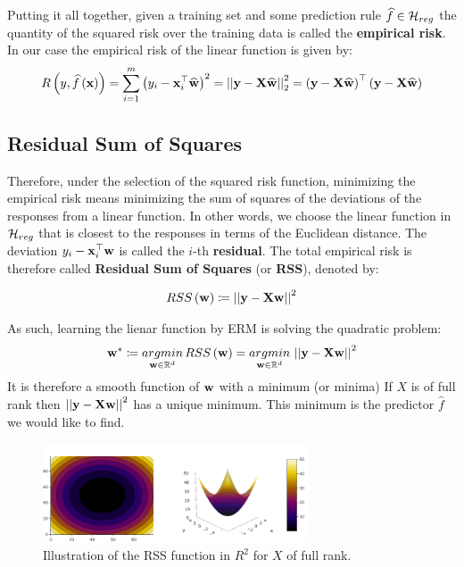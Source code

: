 Putting it all together, given a training set \trainset and some prediction rule $\widehat{f}\in\mathcal{H}_{reg}$ the quantity of the squared risk over the training data is called the \textbf{empirical risk}. In our case the empirical risk of the linear function is given by: $$ R\left(y,\widehat{f}\left(\mathbf{x}\right)\right)=\sum^m_{i=1}\left(y_i-\mathbf{x}_i^\top\widehat{\mathbf{w}}\right)^2 = \left|\left| \mathbf{y}-\mathbf{X}\widehat{\mathbf{w}}\right|\right|^2_2=\left(\mathbf{y}-\mathbf{X}\widehat{\mathbf{w}}\right)^\top \left(\mathbf{y}-\mathbf{X}\widehat{\mathbf{w}}\right)$$

\subsection{Residual Sum of Squares}\label{rss}
Therefore, under the selection of the squared risk function, minimizing the empirical risk means minimizing the sum of squares of the deviations of the responses from a linear function. In other words, we choose the linear function in $\mathcal{H}_{reg}$ that is closest to the responses in terms of the Euclidean distance. The deviation $y_i-\mathbf{x}_i^\top\mathbf{w}$ is called the $i$-th \textbf{residual}. The total empirical risk is therefore called \textbf{Residual Sum of Squares} (or \textbf{RSS}), denoted by:

\begin{align}
RSS\left(\mathbf{w}\right) \coloneqq \left|\left| \mathbf{y}-\mathbf{X}\mathbf{w}\right|\right|^2
\label{eqn:rss}
\end{align}

As such, learning the lienar function by ERM is solving the quadratic problem:
\begin{align}
\mathbf{w}^*\coloneqq\underset{\mathbf{w}\in\mathbb{R}^d}{argmin}\,RSS\left(\mathbf{w}\right)=\underset{\mathbf{w}\in\mathbb{R}^d}{argmin}\,\left|\left| \mathbf{y}-\mathbf{X}\mathbf{w}\right|\right|^2
\label{eqn:opt_rss}
\end{align}
It is therefore a smooth function of $\mathbf{w}$ with a minimum (or minima) If $X$ is of full rank then $\left|\left| \mathbf{y}-\mathbf{X}\mathbf{w}\right|\right|^2$ has a unique minimum. This minimum is the predictor $\widehat{f}$ we would like to find.


\begin{figure}[H]
	\centering
	\includegraphics[width=0.7\textwidth]{chapters/intro.regression/figures/rss.png}
	\caption{Illustration of the RSS function in $R^2$ for $X$ of full rank. \GitChapterTwoExamples}
\end{figure}

